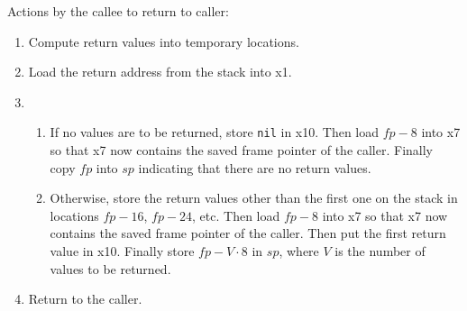 Actions by the callee to return to caller:

\begin{enumerate}
\item Compute return values into temporary locations.
\item Load the return address from the stack into x1.
\item
  \begin{enumerate}
  \item If no values are to be returned, store \texttt{nil} in x10.
    Then load $fp - 8$ into x7 so that x7 now contains the saved frame
    pointer of the caller.  Finally copy $fp$ into $sp$ indicating
    that there are no return values.
  \item Otherwise, store the return values other than the first one on
    the stack in locations $fp - 16$, $fp - 24$, etc.  Then load $fp -
    8$ into x7 so that x7 now contains the saved frame pointer of the
    caller.  Then put the first return value in x10.  Finally store
    $fp - V \cdot 8$ in $sp$, where $V$ is the number of values to be
    returned.
  \end{enumerate}
\item Return to the caller.
\end{enumerate}




